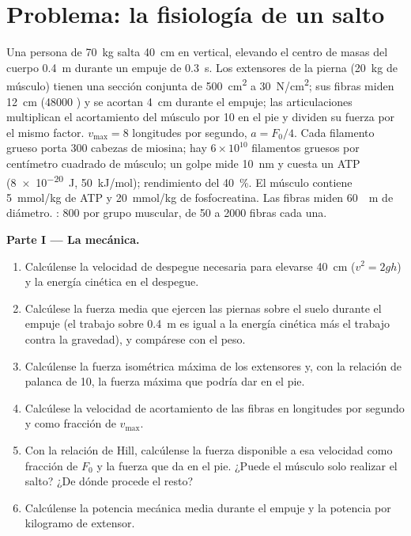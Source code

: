 \section{Problema: la fisiología de un salto}

\begin{problem}
\label{pb:b2:muscle-movement:1}
Una persona de \qty{70}{kg} salta \qty{40}{cm} en vertical, elevando el
centro de masas del cuerpo \qty{0.4}{m} durante un empuje de
\qty{0.3}{s}. Los extensores de la pierna (\qty{20}{kg} de músculo) tienen
una sección conjunta de \qty{500}{cm^2} a \qty{30}{N/cm^2}; sus fibras
miden \qty{12}{cm} (\num{48000} ) y se acortan \qty{4}{cm}
durante el empuje; las articulaciones multiplican el acortamiento del
músculo por \num{10} en el pie y dividen su fuerza por el mismo factor.
$v_{\max} = 8$ longitudes por segundo, $a = F_0/4$. Cada filamento grueso
porta \num{300} cabezas de miosina; hay $6\times
10^{10}$ filamentos gruesos por centímetro cuadrado de músculo; un golpe
mide \qty{10}{nm} y cuesta un ATP (\qty{8e-20}{J}, \qty{50}{kJ/mol});
rendimiento del \qty{40}{\%}. El músculo contiene \qty{5}{mmol/kg} de ATP
y \qty{20}{mmol/kg} de fosfocreatina. Las fibras miden \qty{60}{\micro
m} de diámetro. : \num{800} por grupo muscular, de
\num{50} a \num{2000} fibras cada una.

\medskip
\noindent\textbf{Parte I --- La mecánica.}
\begin{enumerate}
  \item Calcúlense la velocidad de despegue necesaria para elevarse
        \qty{40}{cm} ($v^{2} = 2gh$) y la energía cinética en el despegue.
  \item Calcúlese la fuerza media que ejercen las piernas sobre el suelo
        durante el empuje (el trabajo sobre \qty{0.4}{m} es igual a la
        energía cinética más el trabajo contra la gravedad), y compárese
        con el peso.
  \item Calcúlense la fuerza isométrica máxima de los extensores y, con la
        relación de palanca de 10, la fuerza máxima que podría dar en el
        pie.
  \item Calcúlese la velocidad de acortamiento de las fibras en longitudes
        por segundo y como fracción de $v_{\max}$.
  \item Con la relación de Hill, calcúlense la fuerza disponible a esa
        velocidad como fracción de $F_0$ y la fuerza que da en el pie.
        ¿Puede el músculo solo realizar el salto? ¿De dónde procede el
        resto?
  \item Calcúlense la potencia mecánica media durante el empuje y la
        potencia por kilogramo de extensor.
\end{enumerate}


\end{problem}
